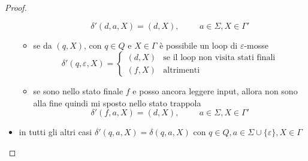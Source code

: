 \documentclass[12pt]{article}
\begin{document}
\begin{proof}
\begin{itemize}
\begin{itemize}
					$$\delta'(d, a, X) = (d, X),\hspace{1cm}a \in \Sigma, X \in \Gamma'$$
				\item se da $(q, X)$, con $q \in Q$ e $X \in \Gamma$ è possibile un loop di $\varepsilon$-mosse
					$$\delta'(q, \varepsilon, X) = 
					\begin{cases}
						(d, X) & \text{se il loop non visita stati finali} \\
						(f, X) & \text{altrimenti}
					\end{cases}
					$$
				\item se sono nello stato finale $f$ e posso ancora leggere input, allora non sono alla fine quindi mi sposto nello stato trappola
					$$\delta'(f, a, X) = (d, X), \hspace{1cm}a \in \Sigma, X \in \Gamma'$$
			\end{itemize}
		\item in tutti gli altri casi $\delta'(q, a, X) = \delta(q, a, X)$ con $q \in Q, a \in \Sigma \cup \{\varepsilon\}, X \in \Gamma$
	\end{itemize}
\end{proof}
\end{document}
